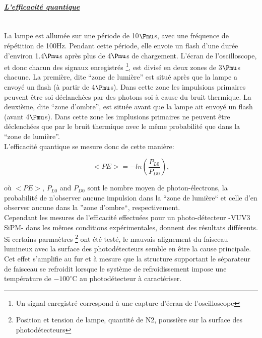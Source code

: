\documentclass[a4paper, 11pt]{report}%
\begin{document}
\paragraph{\textit{\underline{L'efficacit\'e quantique}}}
  \leavevmode
  \\
  
  La lampe est allum\'ee sur une p\'eriode de 10$\Pmu$s, avec une fr\'equence de r\'ep\'etition de 100Hz. Pendant cette p\'eriode, elle envoie 
  un flash d'une dur\'ee d'environ 1.4$\Pmu$s apr\`es plus de 4$\Pmu$s de chargement. L'\'ecran de l'oscilloscope, et donc chacun des
  signaux enregistr\'es \footnote{Un signal enregistr\'e correspond \`a une capture d'\'ecran de l'oscilloscope}, est divis\'e en deux zones
  de 3$\Pmu$s chacune.
  La premi\`ere, dite ``zone
  de lumi\`ere'' est situ\'e apr\`es que la lampe a envoyé un flash (\`a partir de 4$\Pmu$s). Dans cette zone les impulsions primaires 
  peuvent \^etre soi d\'eclanch\'ees par des photons soi \`a cause du bruit thermique. La deuxi\`eme, dite ``zone d'ombre'', est situ\'ee avant 
  que la lampe ait envoy\'e un flash (avant 4$\Pmu$s). Dans cette zone les implusions primaires ne peuvent \^etre d\'eclench\'ees que par le bruit 
  thermique avec le m\^eme probabilit\'e que dans la ``zone de lumi\`ere''. 
  \\
  
  L'efficacit\'e quantique se mesure donc de cette mani\`ere:
  
  \begin{equation}
    <PE> =  -ln(\frac{P_{L0}}{P_{D0}}), 
  \end{equation}
 
  o\`u $<PE>$, $P_{L0}$ and $P_{D0}$ sont le nombre moyen de photon-\'electrons, la probabilit\'e de n'observer aucune impulsion dans la ``zone 
  de lumi\`ere`` et celle d'en observer aucune dans la ''zone d'ombre``, respectivement.\\
  Cependant les mesures de l'efficacit\'e effectu\'ees pour un photo-d\'etecteur -VUV3 SiPM- dans les m\^emes conditions exp\'erimentales, donnent 
  des r\'esultats diff\'erents. Si certains parma\`etres \footnote{Position et tension de lampe, quantit\'e de N2, poussi\`ere sur la surface des 
  photod\'etecteurs} ont \'et\'e test\'e, le mauvais alignement du faisceau lumineux avec la surface des photod\'etecteurs semble en \^etre la cause 
  principale. Cet effet s'amplifie au fur et \`a mesure que la structure supportant le s\'eparateur de faisceau se refroidit lorsque le 
  syst\`eme de refroidissement impose une temp\'erature de $-100^\circ$C au photod\'etecteur \`a caract\'eriser.
  
\end{document}
